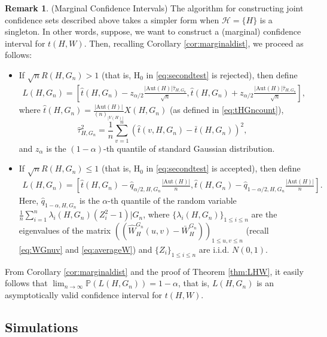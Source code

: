 \documentclass[11pt,reqno]{amsart}
\numberwithin{equation}{section}
\renewcommand{\P}{\mathbb{P}}
\newcommand{\cH}{{\mathcal H}}
\newcommand{\ra}{\rightarrow}
\newcommand\Aut{\mathrm{Aut}}
\theoremstyle{definition}
\newtheorem{remark}{Remark}[section]
\begin{document}
\begin{remark}\label{remark:intervalH} (Marginal Confidence Intervals) 
The algorithm for constructing joint confidence sets described above takes a simpler form when $\cH= \{H\}$ is a singleton. In other words, suppose, we want to construct a (marginal) confidence interval for $t(H,W)$. Then, recalling Corollary \ref{cor:marginaldist},  we proceed as follows: 

\begin{itemize}
    
    \item If $\sqrt{n}R(H,G_{n}) > 1$ (that is, $\mathrm{H}_0$ in \eqref{eq:secondtest} is rejected), then define 
    \begin{align*}
        L(H,G_n) = \left[\hat t(H, G_n) - z_{\alpha/2}\frac{|\Aut(H)|\hat{\tau}_{H,G_n}}{\sqrt{n}}, \hat t(H, G_n) + z_{\alpha/2}\frac{|\Aut(H)|\hat{\tau}_{H,G_n}}{\sqrt{n}}\right] ,  
    \end{align*}
    where $\hat t(H, G_n) = \frac{|\Aut(H)|}{(n)_{|V(H)|}}X(H, G_n)$ (as defined in \eqref{eq:tHGncount}), $$\hat{\tau}_{H,G_n}^2 = \frac{1}{n}\sum_{v=1}^n\left( \hat t(v, H, G_n) -  \bar t(H, G_n) \right)^2,$$
    and $z_{\alpha}$ is the $(1-\alpha)$-th quantile of standard Gaussian distribution.
   
    \item If $\sqrt{n}R(H,G_{n}) \leq 1$ (that is, $\mathrm{H}_0$ in \eqref{eq:secondtest} is accepted), then define 
    \begin{align*}
        L(H,G_n) = \left[\hat t(H, G_n) - \hat q_{\alpha/2, H, G_n}\frac{|\Aut(H)|}{n}, \hat t(H, G_n) - \hat q_{1-\alpha/2, H, G_n}\frac{|\Aut(H)|}{n}\right].
    \end{align*}
    Here, $\hat q_{1-\alpha,H,G_n}$ is the $\alpha$-th quantile of the random variable $\frac{1}{n}\sum_{i=1}^{n} \lambda_i(H,G_n)(Z_i^2-1)|G_n$, where $\{\lambda_{i}(H,G_n)\}_{1\leq i\leq n}$ are the eigenvalues of the matrix $((\hat W_{H}^{G_n}(u, v) - \bar W_{H}^{G_n}))_{1 \leq u, v \leq n}$ (recall \eqref{eq:WGnuv} and \eqref{eq:averageW}) and $\{Z_i\}_{1\leq i\leq n}$ are i.i.d. $N(0, 1)$. 
\end{itemize}
From Corollary \ref{cor:marginaldist} and the proof of Theorem \ref{thm:LHW}, it easily follows that $\lim_{n\ra\infty}\P\left(L(H,G_n)\right) = 1-\alpha$, that is, $L(H,G_n)$ is an asymptotically valid confidence interval for $t(H, W)$. 
\end{remark}


\subsection{Simulations} 
\label{sec:simulations} 
\end{document}

